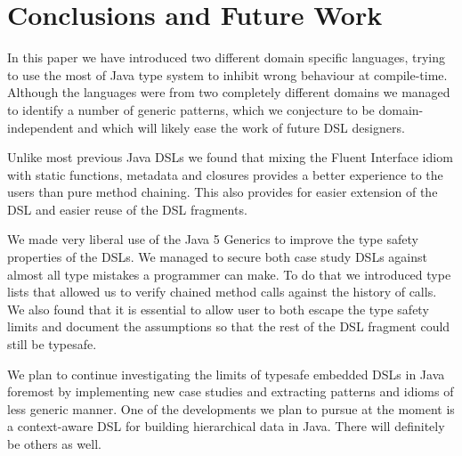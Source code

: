 \documentclass{sig-alternate}
\begin{document}
\section{Conclusions and Future Work}

In this paper we have introduced two different domain specific languages, trying to use the most of Java type system to inhibit wrong behaviour at compile-time. Although the languages were from two completely different domains we managed to identify a number of generic patterns, which we conjecture to be domain-independent and which will likely ease the work of future DSL designers.

Unlike most previous Java DSLs we found that mixing the Fluent Interface idiom with static functions, metadata and closures provides a better experience to the users than pure method chaining. This also provides for easier extension of the DSL and easier reuse of the DSL fragments. 

We made very liberal use of the Java 5 Generics to improve the type safety properties of the DSLs. We managed to secure both case study DSLs against almost all type mistakes a programmer can make. To do that we introduced type lists that allowed us to verify chained method calls against the history of calls. We also found that it is essential to allow user to both escape the type safety limits and document the assumptions so that the rest of the DSL fragment could still be typesafe.

We plan to continue investigating the limits of typesafe embedded DSLs in Java foremost by implementing new case studies and extracting patterns and idioms of less generic manner. One of the developments we plan to pursue at the moment is a context-aware DSL for building hierarchical data in Java. There will definitely be others as well.



\end{document}
